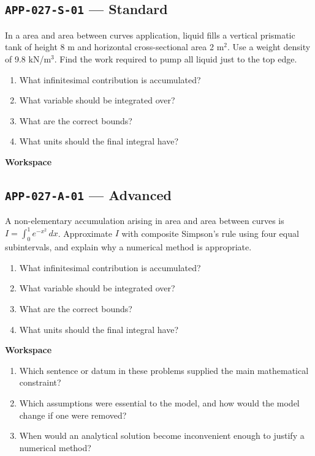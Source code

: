 \documentclass[11pt]{book}
\newcommand{\pid}[1]{\texttt{#1}}
\newcommand{\workspace}{\par\vspace{0.7in}\hrulefill\par\vspace{0.55in}\hrulefill\par}
\begin{document}
\subsection*{\pid{APP-027-S-01} — Standard}
\begin{problembox}
In a area and area between curves application, liquid fills a vertical prismatic tank of height 8 m and horizontal cross-sectional area 2 m$^2$. Use a weight density of 9.8 kN/m$^3$. Find the work required to pump all liquid just to the top edge.
\end{problembox}
\begin{promptbox}\begin{enumerate}
\item What infinitesimal contribution is accumulated?
\item What variable should be integrated over?
\item What are the correct bounds?
\item What units should the final integral have?
\end{enumerate}\end{promptbox}
\textbf{Workspace}\workspace
{}
\subsection*{\pid{APP-027-A-01} — Advanced}
\begin{problembox}
A non-elementary accumulation arising in area and area between curves is $I=\int_0^1 e^{-x^2}\,dx$. Approximate $I$ with composite Simpson's rule using four equal subintervals, and explain why a numerical method is appropriate.
\end{problembox}
\begin{promptbox}\begin{enumerate}
\item What infinitesimal contribution is accumulated?
\item What variable should be integrated over?
\item What are the correct bounds?
\item What units should the final integral have?
\end{enumerate}\end{promptbox}
\textbf{Workspace}\workspace
\begin{reflectionbox}\begin{enumerate}
\item Which sentence or datum in these problems supplied the main mathematical constraint?
\item Which assumptions were essential to the model, and how would the model change if one were removed?
\item When would an analytical solution become inconvenient enough to justify a numerical method?
\end{enumerate}\end{reflectionbox}
\end{document}
